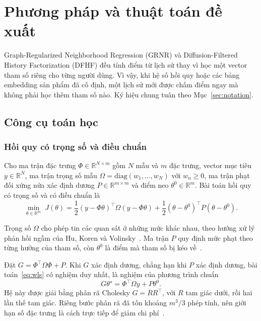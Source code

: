 \section{Phương pháp và thuật toán đề xuất}
\label{sec:method}
\label{sec:problem}

Graph-Regularized Neighborhood Regression (GRNR) và Diffusion-Filtered History Factorization (DFHF) đều tính điểm từ lịch sử thay vì học một vector tham số riêng cho từng người dùng. Vì vậy, khi hệ số hồi quy hoặc các bảng embedding sản phẩm đã cố định, một lịch sử mới được chấm điểm ngay mà không phải học thêm tham số nào. Ký hiệu chung tuân theo Mục~\ref{sec:notation}.

\subsection{Công cụ toán học}
\label{sec:tools}

\subsubsection{Hồi quy có trọng số và điều chuẩn}
\label{sec:ridge}

\begin{dn}
\label{def:wls}
Cho ma trận đặc trưng $\Phi\in\mathbb{R}^{N\times m}$ gồm $N$ mẫu và $m$ đặc trưng, vector mục tiêu $y\in\mathbb{R}^N$, ma trận trọng số mẫu $\Omega=\mathrm{diag}(w_1,\ldots,w_N)$ với $w_n\ge0$, ma trận phạt đối xứng nửa xác định dương $P\in\mathbb{R}^{m\times m}$ và điểm neo $\theta^0\in\mathbb{R}^m$. Bài toán hồi quy có trọng số và có điều chuẩn là
\begin{equation}
\min_{\theta\in\mathbb{R}^m}\;J(\theta)=\frac12(y-\Phi\theta)^\top\Omega(y-\Phi\theta)
+\frac12(\theta-\theta^0)^\top P(\theta-\theta^0).
\label{eq:wls}
\end{equation}
\end{dn}

Trọng số $\Omega$ cho phép tin các quan sát ở những mức khác nhau, theo hướng xử lý phản hồi ngầm của Hu, Koren và Volinsky~\cite{hu2008wmf}. Ma trận $P$ quy định mức phạt theo từng hướng của tham số, còn $\theta^0$ là điểm mà tham số bị kéo về~\cite[Mục~6.3]{boyd2004convex}.

Đặt $G=\Phi^\top\Omega\Phi+P$. Khi $G$ xác định dương, chẳng hạn khi $P$ xác định dương, bài toán~\eqref{eq:wls} có nghiệm duy nhất, là nghiệm của phương trình chuẩn~\cite[Mục~4.4]{boyd2004convex}
\begin{equation}
G\theta^\star=\Phi^\top\Omega y+P\theta^0 .
\label{eq:normal-generic}
\end{equation}
Hệ này được giải bằng phân rã Cholesky $G=RR^\top$, với $R$ tam giác dưới, rồi hai lần thế tam giác. Riêng bước phân rã đã tốn khoảng $m^3/3$ phép tính, nên giới hạn số đặc trưng là cách trực tiếp để giảm chi phí~\cite[Phụ lục~C.2--C.3]{boyd2004convex}.

